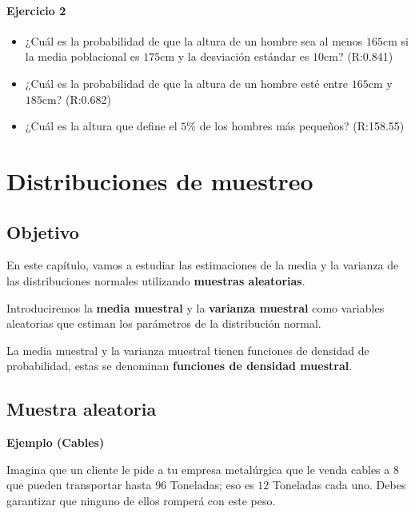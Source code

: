 \documentclass[
]{book}
\begin{document}
\hypertarget{ejercicio-2-6}{%
\subsubsection{Ejercicio 2}\label{ejercicio-2-6}}

\begin{itemize}
\item
  ¿Cuál es la probabilidad de que la altura de un hombre sea al menos
  \(165\)cm si la media poblacional es \(175\)cm y la desviación estándar es \(10\)cm? (R:0.841)
\item
  ¿Cuál es la probabilidad de que la altura de un hombre esté entre
  \(165\)cm y \(185\)cm? (R:0.682)
\item
  ¿Cuál es la altura que define el \(5\%\) de los hombres más pequeños? (R:158.55)
\end{itemize}

\hypertarget{distribuciones-de-muestreo}{%
\chapter{Distribuciones de muestreo}\label{distribuciones-de-muestreo}}

\hypertarget{objetivo-6}{%
\section{Objetivo}\label{objetivo-6}}

En este capítulo, vamos a estudiar las estimaciones de la media y la varianza de las distribuciones normales utilizando \textbf{muestras aleatorias}.

Introduciremos la \textbf{media muestral} y la \textbf{varianza muestral} como variables aleatorias que estiman los parámetros de la distribución normal.

La media muestral y la varianza muestral tienen funciones de densidad de probabilidad, estas se denominan \textbf{funciones de densidad muestral}.

\hypertarget{muestra-aleatoria}{%
\section{Muestra aleatoria}\label{muestra-aleatoria}}

\textbf{Ejemplo (Cables)}

Imagina que un cliente le pide a tu empresa metalúrgica que le venda cables a \(8\) que pueden transportar hasta \(96\) Toneladas; eso es \(12\) Toneladas cada uno. Debes garantizar que ninguno de ellos romperá con este peso.
\end{document}
